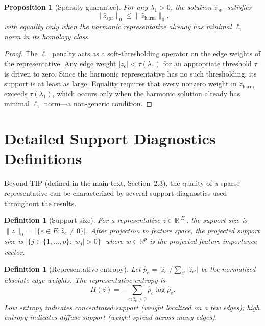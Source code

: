 \documentclass[11pt]{article}
\newtheorem{proposition}[theorem]{Proposition}
\newtheorem{definition}[theorem]{Definition}
\begin{document}
\begin{proposition}[Sparsity guarantee]\label{prop:supp_sparsity}
For any $\lambda_1 > 0$, the solution $\hat{z}_{\mathrm{spr}}$ satisfies
\[
\|\hat{z}_{\mathrm{spr}}\|_0 \le \|\hat{z}_{\mathrm{harm}}\|_0,
\]
with equality only when the harmonic representative already has minimal $\ell_1$ norm in its homology class.
\end{proposition}

\begin{proof}
The $\ell_1$ penalty acts as a soft-thresholding operator on the edge weights of the representative.
Any edge weight $|z_e| < \tau(\lambda_1)$ for an appropriate threshold $\tau$ is driven to zero.
Since the harmonic representative has no such thresholding, its support is at least as large.
Equality requires that every nonzero weight in $\hat{z}_{\mathrm{harm}}$ exceeds $\tau(\lambda_1)$, which occurs only when the harmonic solution already has minimal $\ell_1$ norm---a non-generic condition.
\end{proof}


\section{Detailed Support Diagnostics Definitions}
\label{sec:supp_diagnostics}

Beyond TIP (defined in the main text, Section~2.3), the quality of a sparse representative can be characterized by several support diagnostics used throughout the results.

\begin{definition}[Support size]\label{def:supp_support}
For a representative $\hat{z} \in \mathbb{R}^{|E|}$, the \emph{support size} is $\|\hat{z}\|_0 = |\{e \in E : \hat{z}_e \ne 0\}|$.
After projection to feature space, the \emph{projected support size} is $|\{j \in \{1,\ldots,p\} : |w_j| > 0\}|$ where $w \in \mathbb{R}^p$ is the projected feature-importance vector.
\end{definition}

\begin{definition}[Representative entropy]\label{def:supp_entropy}
Let $\hat{p}_e = |\hat{z}_e| / \sum_{e'} |\hat{z}_{e'}|$ be the normalized absolute edge weights.
The \emph{representative entropy} is
\[
H(\hat{z}) = -\sum_{e : \hat{z}_e \ne 0} \hat{p}_e \log \hat{p}_e.
\]
Low entropy indicates concentrated support (weight localized on a few edges); high entropy indicates diffuse support (weight spread across many edges).
\end{definition}
\end{document}

